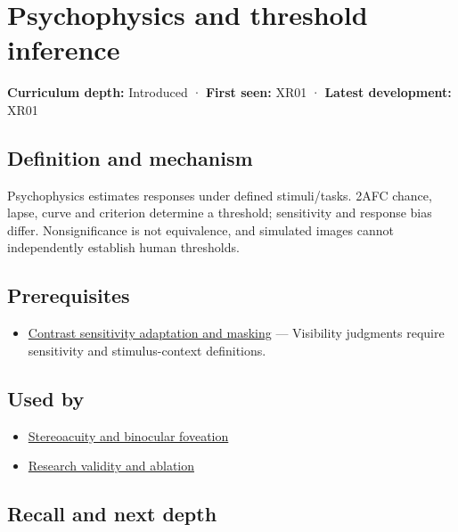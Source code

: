 \hypertarget{appendix-1759f03e8ce7}{}
\section{Psychophysics and threshold inference}\label{appendix-1759f03e8ce7-psychophysics-and-threshold-inference}

\textbf{Curriculum depth:} Introduced · \textbf{First seen:} XR01 · \textbf{Latest development:} XR01

\subsection{Definition and mechanism}\label{appendix-1759f03e8ce7-definition-and-mechanism}

Psychophysics estimates responses under defined stimuli/tasks. 2AFC chance, lapse, curve and criterion determine a threshold; sensitivity and response bias differ. Nonsignificance is not equivalence, and simulated images cannot independently establish human thresholds.

\subsection{Prerequisites}\label{appendix-1759f03e8ce7-prerequisites}

\begin{itemize}
\tightlist
\item
  \hyperref[appendix-b3aa9e8e01ad]{Contrast sensitivity adaptation and masking} --- Visibility judgments require sensitivity and stimulus-context definitions.
\end{itemize}

\subsection{Used by}\label{appendix-1759f03e8ce7-used-by}

\begin{itemize}
\tightlist
\item
  \hyperref[appendix-8dc848f14052]{Stereoacuity and binocular foveation}
\item
  \hyperref[appendix-65788587ef78]{Research validity and ablation}
\end{itemize}

\subsection{Recall and next depth}\label{appendix-1759f03e8ce7-recall-and-next-depth}

